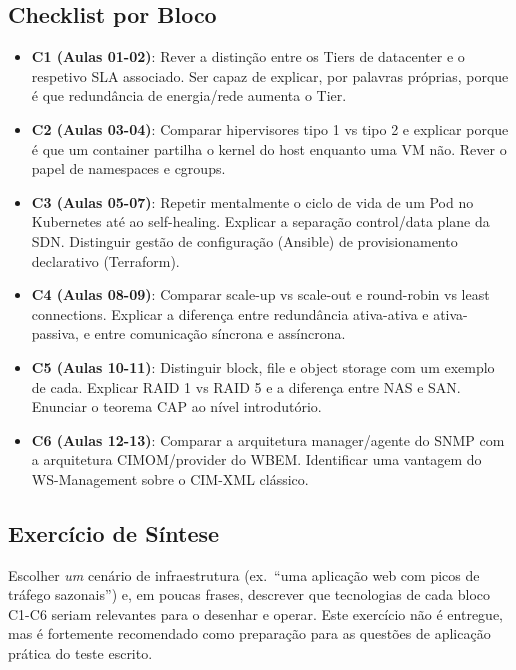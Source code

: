 \documentclass[11pt,a4paper]{article}
\begin{document}
\subsection{Checklist por Bloco}
\begin{itemize}[itemsep=0.3cm]
  \item \textbf{C1 (Aulas 01-02)}: Rever a distinção entre os Tiers de datacenter e o respetivo SLA associado. Ser capaz de explicar, por palavras próprias, porque é que redundância de energia/rede aumenta o Tier.
  \item \textbf{C2 (Aulas 03-04)}: Comparar hipervisores tipo 1 vs tipo 2 e explicar porque é que um container partilha o kernel do host enquanto uma VM não. Rever o papel de namespaces e cgroups.
  \item \textbf{C3 (Aulas 05-07)}: Repetir mentalmente o ciclo de vida de um Pod no Kubernetes até ao self-healing. Explicar a separação control/data plane da SDN. Distinguir gestão de configuração (Ansible) de provisionamento declarativo (Terraform).
  \item \textbf{C4 (Aulas 08-09)}: Comparar scale-up vs scale-out e round-robin vs least connections. Explicar a diferença entre redundância ativa-ativa e ativa-passiva, e entre comunicação síncrona e assíncrona.
  \item \textbf{C5 (Aulas 10-11)}: Distinguir block, file e object storage com um exemplo de cada. Explicar RAID 1 vs RAID 5 e a diferença entre NAS e SAN. Enunciar o teorema CAP ao nível introdutório.
  \item \textbf{C6 (Aulas 12-13)}: Comparar a arquitetura manager/agente do SNMP com a arquitetura CIMOM/provider do WBEM. Identificar uma vantagem do WS-Management sobre o CIM-XML clássico.
\end{itemize}

\subsection{Exercício de Síntese}
Escolher \emph{um} cenário de infraestrutura (ex.\ ``uma aplicação web com picos de tráfego sazonais'') e, em poucas frases, descrever que tecnologias de cada bloco C1-C6 seriam relevantes para o desenhar e operar. Este exercício não é entregue, mas é fortemente recomendado como preparação para as questões de aplicação prática do teste escrito.
\end{document}

